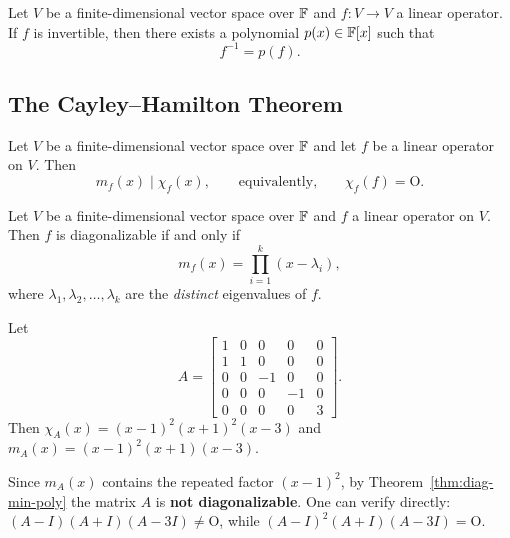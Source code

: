 \begin{corbox}
\label{cor:inverse-poly}
Let $V$ be a finite-dimensional vector space over $\mathbb{F}$ and $f:V\to V$ a
linear operator.  If $f$ is invertible, then there exists a polynomial
$p(x)\in\mathbb{F}[x]$ such that
\[
    f^{-1} = p(f).
\]
\end{corbox}

\subsection{The Cayley--Hamilton Theorem}

\begin{thmbox}
\label{thm:cayley-hamilton}
Let $V$ be a finite-dimensional vector space over $\mathbb{F}$ and let $f$ be a
linear operator on $V$.  Then
\[
    m_f(x) \mid \chi_f(x),
    \qquad\text{equivalently,}\qquad
    \chi_f(f) = \mathrm{O}.
\]
\end{thmbox}

\begin{thmbox}
\label{thm:diag-min-poly}
Let $V$ be a finite-dimensional vector space over $\mathbb{F}$ and $f$ a linear
operator on $V$.  Then $f$ is diagonalizable if and only if
\[
    m_f(x) = \prod_{i=1}^k (x-\lambda_i),
\]
where $\lambda_1,\lambda_2,\ldots,\lambda_k$ are the \emph{distinct}
eigenvalues of $f$.
\end{thmbox}

\begin{exbox}
\label{ex:non-diag-min-poly}
Let
\[
    A = \begin{bmatrix}
        1&0&0&0&0\\
        1&1&0&0&0\\
        0&0&-1&0&0\\
        0&0&0&-1&0\\
        0&0&0&0&3
    \end{bmatrix}.
\]
Then $\chi_A(x)=(x-1)^2(x+1)^2(x-3)$ and $m_A(x)=(x-1)^2(x+1)(x-3)$.

\smallskip
Since $m_A(x)$ contains the repeated factor $(x-1)^2$, by
Theorem~\ref{thm:diag-min-poly} the matrix $A$ is \textbf{not
diagonalizable}.  One can verify directly:
$(A-I)(A+I)(A-3I)\neq\mathrm{O}$, while
$(A-I)^2(A+I)(A-3I)=\mathrm{O}$.
\end{exbox}

